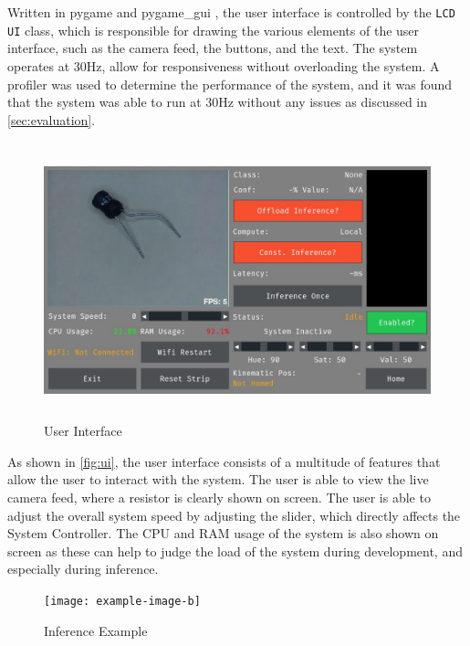 Written in pygame \cite{pygamedoc} and pygame\_gui \cite{pygamegui}, the user interface is controlled by the \texttt{LCD UI} class, which is responsible for drawing the various elements of the user interface, such as the camera feed, the buttons, and the text. The system operates at 30Hz, allow for responsiveness without overloading the system. A profiler was used to determine the performance of the system, and it was found that the system was able to run at 30Hz without any issues as discussed in \autoref{sec:evaluation}.


\begin{figure}[H]
    \hfill
    \begin{minipage}[t]{\textwidth}
      \centering
      \includegraphics[height=8cm]{imgs/software/screenresistor.jpg}
      \caption{User Interface}
      \label{fig:ui}
    \end{minipage}
\end{figure}

As shown in \autoref{fig:ui}, the user interface consists of a multitude of features that allow the user to interact with the system. The user is able to view the live camera feed, where a resistor is clearly shown on screen. The user is able to adjust the overall system speed by adjusting the slider, which directly affects the System Controller. The CPU and RAM usage of the system is also shown on screen as these can help to judge the load of the system during development, and especially during inference. 

\begin{figure}[H]
    \hfill
    \begin{minipage}[t]{\textwidth}
      \centering
      \texttt{[image: example-image-b]}
      \caption{Inference Example}
      \label{fig:uiinference}
    \end{minipage}
\end{figure}

